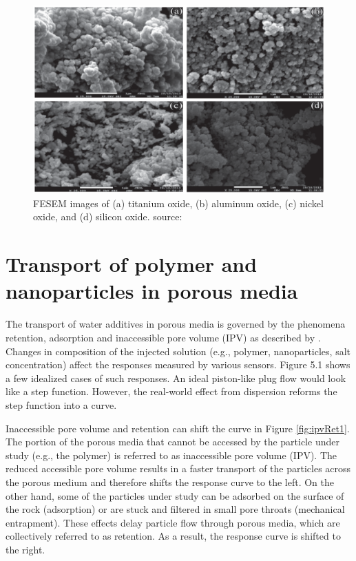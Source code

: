 \begin{figure}
    \centering
    \includegraphics[width=\textwidth]{img/fig/npFesem.png}
    \caption{FESEM images of (a) titanium oxide, (b) aluminum oxide, (c) nickel oxide, and (d) silicon oxide. source: \citet{Alomair2015} }
    \label{fig:npFesem}
\end{figure}



\section{Transport of polymer and nanoparticles in porous media}
The transport of water additives in porous media  is governed by the phenomena  retention, adsorption  and inaccessible pore volume  (IPV) as described by \citep{Lotsch1985}. Changes in composition of the injected solution (e.g., polymer, nanoparticles, salt concentration) affect the responses measured by various sensors. Figure 5.1 shows a few idealized cases of such responses. An ideal piston-like plug flow would look like a step function. However, the real-world effect from dispersion reforms the step function into a curve.

Inaccessible pore volume and retention can shift the curve in Figure \ref{fig:ipvRet1}. The portion of the porous media that cannot be accessed by the particle under study (e.g., the polymer) is referred to as inaccessible pore volume (IPV). The reduced accessible pore volume results in a faster transport of the particles across the porous medium and therefore shifts the response curve to the left. On the other hand, some of the particles under study can be adsorbed on the surface of the rock (adsorption) or are stuck and filtered in small pore throats  (mechanical entrapment). These effects delay particle flow through porous media, which are collectively referred to as  retention. As a result, the response curve is shifted to the right. 

